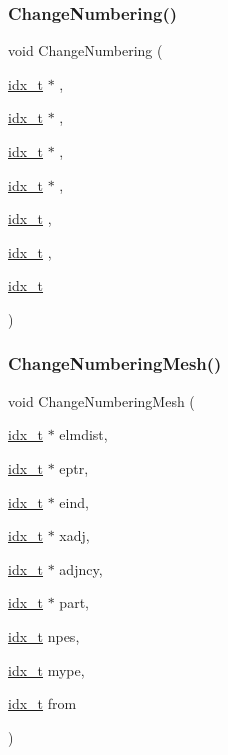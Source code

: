 \subsubsection{\texorpdfstring{Change\+Numbering()}{ChangeNumbering()}}
{\footnotesize\ttfamily void Change\+Numbering (\begin{DoxyParamCaption}\item[{\hyperlink{a00876_aaa5262be3e700770163401acb0150f52}{idx\+\_\+t} $\ast$}]{,  }\item[{\hyperlink{a00876_aaa5262be3e700770163401acb0150f52}{idx\+\_\+t} $\ast$}]{,  }\item[{\hyperlink{a00876_aaa5262be3e700770163401acb0150f52}{idx\+\_\+t} $\ast$}]{,  }\item[{\hyperlink{a00876_aaa5262be3e700770163401acb0150f52}{idx\+\_\+t} $\ast$}]{,  }\item[{\hyperlink{a00876_aaa5262be3e700770163401acb0150f52}{idx\+\_\+t}}]{,  }\item[{\hyperlink{a00876_aaa5262be3e700770163401acb0150f52}{idx\+\_\+t}}]{,  }\item[{\hyperlink{a00876_aaa5262be3e700770163401acb0150f52}{idx\+\_\+t}}]{ }\end{DoxyParamCaption})}

\mbox{\label{a00951_aabf24a234bc50173d130585c678aad92}} 
\subsubsection{\texorpdfstring{Change\+Numbering\+Mesh()}{ChangeNumberingMesh()}}
{\footnotesize\ttfamily void Change\+Numbering\+Mesh (\begin{DoxyParamCaption}\item[{\hyperlink{a00876_aaa5262be3e700770163401acb0150f52}{idx\+\_\+t} $\ast$}]{elmdist,  }\item[{\hyperlink{a00876_aaa5262be3e700770163401acb0150f52}{idx\+\_\+t} $\ast$}]{eptr,  }\item[{\hyperlink{a00876_aaa5262be3e700770163401acb0150f52}{idx\+\_\+t} $\ast$}]{eind,  }\item[{\hyperlink{a00876_aaa5262be3e700770163401acb0150f52}{idx\+\_\+t} $\ast$}]{xadj,  }\item[{\hyperlink{a00876_aaa5262be3e700770163401acb0150f52}{idx\+\_\+t} $\ast$}]{adjncy,  }\item[{\hyperlink{a00876_aaa5262be3e700770163401acb0150f52}{idx\+\_\+t} $\ast$}]{part,  }\item[{\hyperlink{a00876_aaa5262be3e700770163401acb0150f52}{idx\+\_\+t}}]{npes,  }\item[{\hyperlink{a00876_aaa5262be3e700770163401acb0150f52}{idx\+\_\+t}}]{mype,  }\item[{\hyperlink{a00876_aaa5262be3e700770163401acb0150f52}{idx\+\_\+t}}]{from }\end{DoxyParamCaption})}

